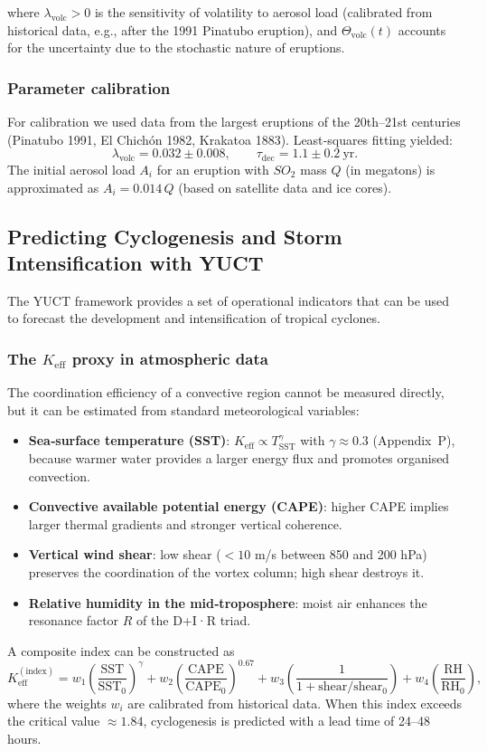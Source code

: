 \documentclass[12pt,a4paper]{article}
\newcommand{\Keff}{K_{\mathrm{eff}}}
\begin{document}
	where \(\lambda_{\text{volc}} > 0\) is the sensitivity of volatility to aerosol load (calibrated from historical data, e.g., after the 1991 Pinatubo eruption), and \(\Theta_{\text{volc}}(t)\) accounts for the uncertainty due to the stochastic nature of eruptions.
	
	\subsubsection{Parameter calibration}
	
	For calibration we used data from the largest eruptions of the 20th–21st centuries (Pinatubo 1991, El Chichón 1982, Krakatoa 1883). Least‑squares fitting yielded:
	\[
	\lambda_{\text{volc}} = 0.032 \pm 0.008, \qquad \tau_{\text{dec}} = 1.1 \pm 0.2\ \text{yr}.
	\]
	The initial aerosol load \(A_i\) for an eruption with \(SO_2\) mass \(Q\) (in megatons) is approximated as \(A_i = 0.014\,Q\) (based on satellite data and ice cores).
	
\subsection{Predicting Cyclogenesis and Storm Intensification with YUCT}
\label{subsec:cyclone_prediction}

The YUCT framework provides a set of operational indicators that can be used to
forecast the development and intensification of tropical cyclones.

\subsubsection*{The $K_{\mathrm{eff}}$ proxy in atmospheric data}

The coordination efficiency of a convective region cannot be measured directly,
but it can be estimated from standard meteorological variables:
\begin{itemize}
	\item \textbf{Sea‑surface temperature (SST)}: $K_{\mathrm{eff}} \propto T_{\mathrm{SST}}^{\gamma}$
	with $\gamma \approx 0.3$ (Appendix~P), because warmer water provides
	a larger energy flux and promotes organised convection.
	\item \textbf{Convective available potential energy (CAPE)}: higher CAPE
	implies larger thermal gradients and stronger vertical coherence.
	\item \textbf{Vertical wind shear}: low shear ($< 10$ m/s between 850 and
	200 hPa) preserves the coordination of the vortex column; high shear
	destroys it.
	\item \textbf{Relative humidity in the mid‑troposphere}: moist air enhances
	the resonance factor $R$ of the D+I·R triad.
\end{itemize}
A composite index can be constructed as
\[
\Keff^{\mathrm{(index)}} = w_1 \left( \frac{\mathrm{SST}}{\mathrm{SST}_0} \right)^{\gamma}
+ w_2 \left( \frac{\mathrm{CAPE}}{\mathrm{CAPE}_0} \right)^{0.67}
+ w_3 \left( \frac{1}{1 + \mathrm{shear}/\mathrm{shear}_0} \right)
+ w_4 \left( \frac{\mathrm{RH}}{\mathrm{RH}_0} \right),
\]
where the weights $w_i$ are calibrated from historical data.  When this index
exceeds the critical value $\approx 1.84$, cyclogenesis is predicted with a lead
time of 24--48 hours.
\end{document}
